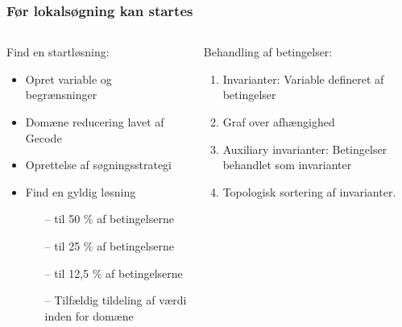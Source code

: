\documentclass[smaller]{beamer}
\begin{document}



% 
\begin{frame}
 \frametitle{Før lokalsøgning kan startes}
 \begin{columns}[T]
    \begin{column}[T]{.5\textwidth}
Find en startløsning:
\begin{itemize}[<+->]
\pause 
\item Opret variable og begrænsninger
\item Domæne reducering lavet af Gecode
\item Oprettelse af søgningsstrategi
\item Find en gyldig løsning
\begin{itemize}
 \item[--] til 50 \% af betingelserne
 \item[--] til 25 \% af betingelserne
 \item[--] til 12,5 \% af betingelserne
 \item[--] Tilfældig tildeling af værdi inden for domæne
\end{itemize}
\end{itemize}
\end{column}
\begin{column}[T]{.5\textwidth}
Behandling af betingelser: 
 \begin{enumerate}[<+->]
\item Invarianter: Variable defineret af betingelser
\item Graf over afhængighed
\item Auxiliary invarianter: Betingelser behandlet som invarianter
\item Topologisk sortering af invarianter.
\end{enumerate}

\end{column}

\end{columns}
\end{frame}
\end{document}
